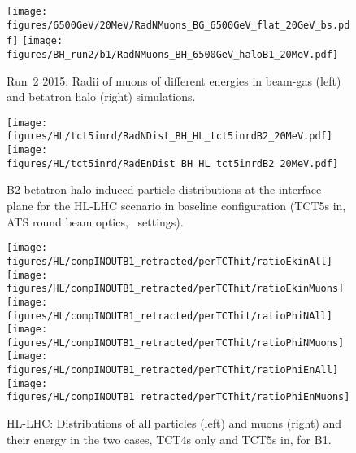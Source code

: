 \begin{figure}
\begin{center}
  \texttt{[image: figures/6500GeV/20MeV/RadNMuons\_BG\_6500GeV\_flat\_20GeV\_bs.pdf]}
  \texttt{[image: figures/BH\_run2/b1/RadNMuons\_BH\_6500GeV\_haloB1\_20MeV.pdf]}      
\end{center}
\vspace{-0.6cm}
 \caption{Run~2 2015: Radii of muons of different energies in beam-gas (left) and betatron halo (right) simulations.
  \label{fig:PhiEnMuComp}}
\end{figure}


\begin{figure}
\begin{center}
\texttt{[image: figures/HL/tct5inrd/RadNDist\_BH\_HL\_tct5inrdB2\_20MeV.pdf]}
\texttt{[image: figures/HL/tct5inrd/RadEnDist\_BH\_HL\_tct5inrdB2\_20MeV.pdf]}
\end{center}
\vspace{-0.6cm}
 \caption{B2 betatron halo induced particle distributions at the interface plane for the HL-LHC scenario in baseline configuration (TCT5s in, ATS round beam optics, \twosigmaret~settings).}
  \label{tct5inrdb2retr2}
\end{figure}



\begin{figure}
\centering
\texttt{[image: figures/HL/compINOUTB1\_retracted/perTCThit/ratioEkinAll]}
\texttt{[image: figures/HL/compINOUTB1\_retracted/perTCThit/ratioEkinMuons]}
\texttt{[image: figures/HL/compINOUTB1\_retracted/perTCThit/ratioPhiNAll]}
\texttt{[image: figures/HL/compINOUTB1\_retracted/perTCThit/ratioPhiNMuons]}
\texttt{[image: figures/HL/compINOUTB1\_retracted/perTCThit/ratioPhiEnAll]}
\texttt{[image: figures/HL/compINOUTB1\_retracted/perTCThit/ratioPhiEnMuons]}
 \caption{HL-LHC: Distributions of all particles (left) and muons (right) and their energy in the two cases, TCT4s only and TCT5s in, for B1.
  \label{fig:compInOutB1_perTCThit}}
\end{figure}




